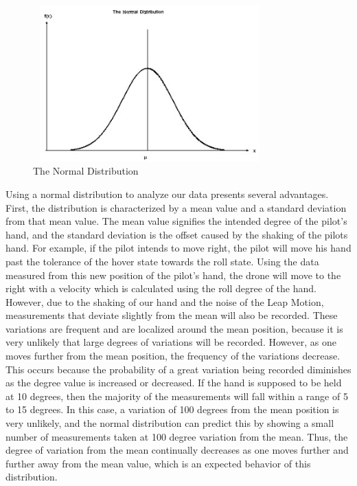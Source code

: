 \documentclass[letterpaper,english, 12pt]{article}
\begin{document}
\begin{figure}[H]
	\centering
	\includegraphics[height=6cm,width=90mm]{pics/genNormalDist1.jpg}
	\caption{The Normal Distribution}
\end{figure}

Using a normal distribution to analyze our data presents several advantages. First, the distribution is characterized by a mean value and a standard deviation from that mean value. The mean value signifies the intended degree of the pilot's hand, and the standard deviation is the offset caused by the shaking of the pilots hand. For example, if the pilot intends to move right, the pilot will move his hand past the tolerance of the hover state towards the roll state. Using the data measured from this new position of the pilot's hand, the drone will move to the right with a velocity which is calculated using the roll degree of the hand. However, due to the shaking of our hand and the noise of the Leap Motion, measurements that deviate slightly from the mean will also be recorded. These variations are frequent and are localized around the mean position, because it is very unlikely that large degrees of variations will be recorded. However, as one moves further from the mean position, the frequency of the variations decrease. This occurs because the probability of a great variation being recorded diminishes as the degree value is increased or decreased. If the hand is supposed to be held at 10 degrees, then the majority of the measurements will fall within a range of 5 to 15 degrees. In this case, a variation of 100 degrees from the mean position is very unlikely, and the normal distribution can predict this by showing a small number of measurements taken at 100 degree variation from the mean. Thus, the degree of variation from the mean continually decreases as one moves further and further away from the mean value, which is an expected behavior of this distribution. 
\end{document}

